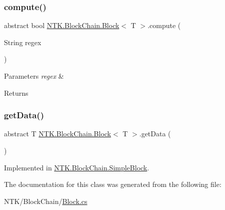 \subsubsection{\texorpdfstring{compute()}{compute()}\hspace{0.1cm}{\footnotesize\ttfamily [2/2]}}
{\footnotesize\ttfamily abstract bool \mbox{\hyperlink{class_n_t_k_1_1_block_chain_1_1_block}{N\+T\+K.\+Block\+Chain.\+Block}}$<$ T $>$.compute (\begin{DoxyParamCaption}\item[{String}]{regex }\end{DoxyParamCaption})\hspace{0.3cm}{\ttfamily [pure virtual]}}






\begin{DoxyParams}{Parameters}
{\em regex} & \\
\hline
\end{DoxyParams}
\begin{DoxyReturn}{Returns}

\end{DoxyReturn}
\mbox{\label{class_n_t_k_1_1_block_chain_1_1_block_ad65b166bcac81fb5a04e52f2d5b53f57}} 
\subsubsection{\texorpdfstring{getData()}{getData()}}
{\footnotesize\ttfamily abstract T \mbox{\hyperlink{class_n_t_k_1_1_block_chain_1_1_block}{N\+T\+K.\+Block\+Chain.\+Block}}$<$ T $>$.get\+Data (\begin{DoxyParamCaption}{ }\end{DoxyParamCaption})\hspace{0.3cm}{\ttfamily [pure virtual]}}



Implemented in \mbox{\hyperlink{class_n_t_k_1_1_block_chain_1_1_simple_block_a733c9456735bd3a0fc50ee2a95ef657c}{N\+T\+K.\+Block\+Chain.\+Simple\+Block}}.



The documentation for this class was generated from the following file\+:\begin{DoxyCompactItemize}
\item 
N\+T\+K/\+Block\+Chain/\mbox{\hyperlink{_block_8cs}{Block.\+cs}}\end{DoxyCompactItemize}
